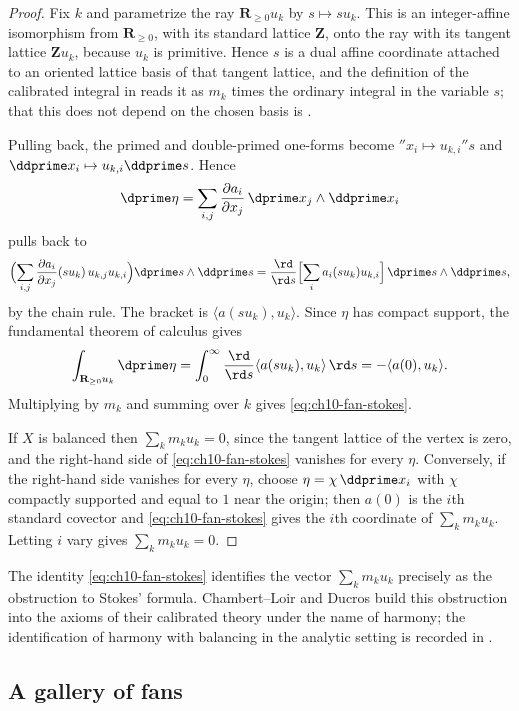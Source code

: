 \begin{proof}
Fix $k$ and parametrize the ray $\mathbf R_{\geq0}u_k$ by $s\mapsto su_k$.
This is an integer-affine isomorphism from $\mathbf R_{\geq0}$, with its
standard lattice $\mathbf Z$, onto the ray with its tangent lattice
$\mathbf Z u_k$, because $u_k$ is primitive.  Hence $s$ is a dual affine
coordinate attached to an oriented lattice basis of that tangent lattice, and
the definition of the calibrated integral in
 reads it as $m_k$ times the ordinary
integral in the variable $s$; that this does not depend on the chosen basis
is .

Pulling back, the primed and double-primed one-forms become
$\dprime x_i\mapsto u_{k,i}\dprime s$ and
$\ddprime x_i\mapsto u_{k,i}\ddprime s$.  Hence
\[
 \dprime\eta
 =\sum_{i,j}\frac{\partial a_i}{\partial x_j}\,
   \dprime x_j\wedge\ddprime x_i
\]
pulls back to
\[
 \Bigl(\sum_{i,j}\frac{\partial a_i}{\partial x_j}(su_k)\,
   u_{k,j}u_{k,i}\Bigr)\dprime s\wedge\ddprime s
 =\frac{\rd}{\rd s}\Bigl[\sum_ia_i(su_k)u_{k,i}\Bigr]\,
   \dprime s\wedge\ddprime s,
\]
by the chain rule.  The bracket is $\langle a(su_k),u_k\rangle$.  Since
$\eta$ has compact support, the fundamental theorem of calculus gives
\[
 \int_{\mathbf R_{\geq0}u_k}\dprime\eta
 =\int_0^{\infty}\frac{\rd}{\rd s}
   \langle a(su_k),u_k\rangle\,\rd s
 =-\langle a(0),u_k\rangle .
\]
Multiplying by $m_k$ and summing over $k$ gives
\eqref{eq:ch10-fan-stokes}.

If $X$ is balanced then $\sum_km_ku_k=0$, since the tangent lattice of the
vertex is zero, and the right-hand side of \eqref{eq:ch10-fan-stokes}
vanishes for every $\eta$.  Conversely, if the right-hand side vanishes for
every $\eta$, choose $\eta=\chi\,\ddprime x_i$ with $\chi$ compactly
supported and equal to $1$ near the origin; then $a(0)$ is the $i$th standard
covector and \eqref{eq:ch10-fan-stokes} gives the $i$th coordinate of
$\sum_km_ku_k$.  Letting $i$ vary gives $\sum_km_ku_k=0$.
\end{proof}

The identity \eqref{eq:ch10-fan-stokes} identifies the vector
$\sum_km_ku_k$ precisely as the obstruction to Stokes' formula.
Chambert--Loir and Ducros build this obstruction into the axioms of their
calibrated theory under the name of harmony; the identification of harmony
with balancing in the analytic setting is recorded in
.

\subsection{A gallery of fans}
\label{sec:ch10-fan-gallery}

